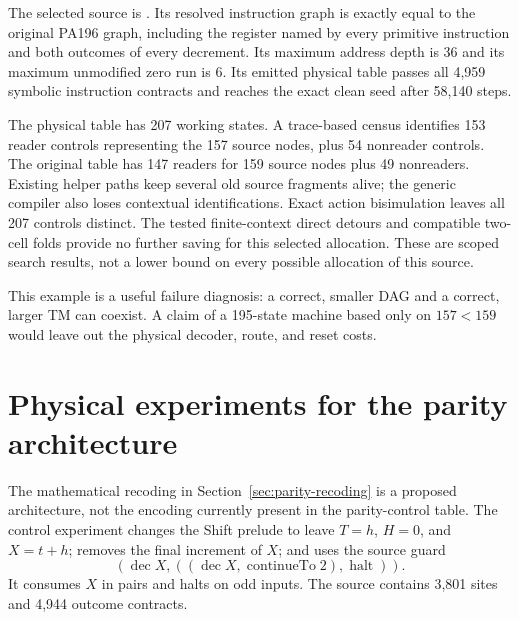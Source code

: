 \documentclass[11pt,a4paper]{article}
\begin{document}
The selected source is
. Its resolved
instruction graph is exactly equal to the original PA196 graph, including
the register named by every primitive instruction and both outcomes of
every decrement. Its maximum address depth is 36 and its maximum unmodified
zero run is 6. Its emitted physical table passes all 4,959 symbolic
instruction contracts and reaches the exact clean seed after 58,140 steps.

The physical table has 207 working states. A trace-based census identifies
153 reader controls representing the 157 source nodes, plus 54 nonreader
controls. The original table has 147 readers for 159 source nodes plus 49
nonreaders. Existing helper paths keep several old source fragments alive;
the generic compiler also loses contextual identifications. Exact action
bisimulation leaves all 207 controls distinct. The tested finite-context
direct detours and compatible two-cell folds provide no further saving for
this selected allocation. These are scoped search results, not a lower
bound on every possible allocation of this source.

This example is a useful failure diagnosis: a correct, smaller DAG and a
correct, larger TM can coexist. A claim of a 195-state machine based only
on $157<159$ would leave out the physical decoder, route, and reset costs.




\section{Physical experiments for the parity architecture}
The mathematical recoding in Section~\ref{sec:parity-recoding} is a proposed
architecture, not the encoding currently present in the parity-control
table. The control experiment changes the Shift prelude to leave
$T=h$, $H=0$, and $X=t+h$; removes the final increment of $X$; and uses
the source guard
\[
       (\operatorname{dec}X,
          ((\operatorname{dec}X,\operatorname{continueTo}2),\operatorname{halt})).
\]
It consumes $X$ in pairs and halts on odd inputs. The source contains
3,801 sites and 4,944 outcome contracts.
\end{document}
